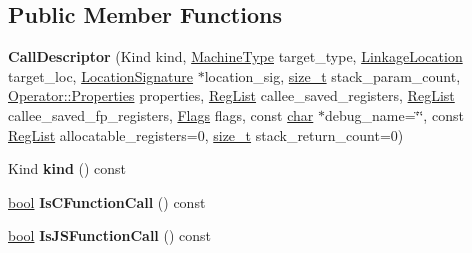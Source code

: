 \subsection*{Public Member Functions}
\begin{DoxyCompactItemize}
\item 
\mbox{\label{classv8_1_1internal_1_1compiler_1_1CallDescriptor_a855c30402e9e8a8b597761d82899f2a2}} 
{\bfseries Call\+Descriptor} (Kind kind, \mbox{\hyperlink{classv8_1_1internal_1_1MachineType}{Machine\+Type}} target\+\_\+type, \mbox{\hyperlink{classv8_1_1internal_1_1compiler_1_1LinkageLocation}{Linkage\+Location}} target\+\_\+loc, \mbox{\hyperlink{classv8_1_1internal_1_1Signature}{Location\+Signature}} $\ast$location\+\_\+sig, \mbox{\hyperlink{classsize__t}{size\+\_\+t}} stack\+\_\+param\+\_\+count, \mbox{\hyperlink{classv8_1_1base_1_1Flags}{Operator\+::\+Properties}} properties, \mbox{\hyperlink{classuint32__t}{Reg\+List}} callee\+\_\+saved\+\_\+registers, \mbox{\hyperlink{classuint32__t}{Reg\+List}} callee\+\_\+saved\+\_\+fp\+\_\+registers, \mbox{\hyperlink{classv8_1_1base_1_1Flags}{Flags}} flags, const \mbox{\hyperlink{classchar}{char}} $\ast$debug\+\_\+name=\char`\"{}\char`\"{}, const \mbox{\hyperlink{classuint32__t}{Reg\+List}} allocatable\+\_\+registers=0, \mbox{\hyperlink{classsize__t}{size\+\_\+t}} stack\+\_\+return\+\_\+count=0)
\item 
\mbox{\label{classv8_1_1internal_1_1compiler_1_1CallDescriptor_a8bc3b5a9cf14c85bd5b02ea7dc0e1cd6}} 
Kind {\bfseries kind} () const
\item 
\mbox{\label{classv8_1_1internal_1_1compiler_1_1CallDescriptor_a8c9d6ab16deca67c3141849d1bd7da32}} 
\mbox{\hyperlink{classbool}{bool}} {\bfseries Is\+C\+Function\+Call} () const
\item 
\mbox{\label{classv8_1_1internal_1_1compiler_1_1CallDescriptor_abdba3fd4d9bf65e9d05ca4ad3a5c9519}} 
\mbox{\hyperlink{classbool}{bool}} {\bfseries Is\+J\+S\+Function\+Call} () const
\item 
\mbox{\label{classv8_1_1internal_1_1compiler_1_1CallDescriptor_ad014b94f23a1c47dd23f1411a006c978}} 

\end{DoxyCompactItemize}
